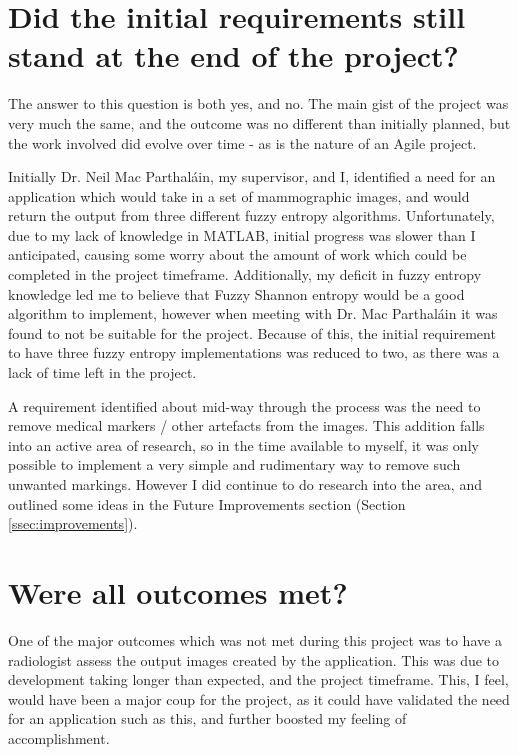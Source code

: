 \section{Did the initial requirements still stand at the end of the project?}

The answer to this question is both yes, and no. The main gist of the project was very much the same, and the outcome was no different than initially planned, but the work involved did evolve over time - as is the nature of an Agile project.

Initially Dr. Neil Mac Parthal\'ain, my supervisor, and I, identified a need for an application which would take in a set of \gls{mammographic images}, and would return the output from three different fuzzy entropy algorithms. Unfortunately, due to my lack of knowledge in MATLAB, initial progress was slower than I anticipated, causing some worry about the amount of work which could be completed in the project timeframe. Additionally, my deficit in fuzzy entropy knowledge led me to believe that Fuzzy Shannon entropy would be a good algorithm to implement, however when meeting with Dr. Mac Parthal\'ain it was found to not be suitable for the project. Because of this, the initial requirement to have three fuzzy entropy implementations was reduced to two, as there was a lack of time left in the project.

A requirement identified about mid-way through the process was the need to remove medical markers / other artefacts from the images. This addition falls into an active area of research, so in the time available to myself, it was only possible to implement a very simple and rudimentary way to remove such unwanted markings. However I did continue to do research into the area, and outlined some ideas in the Future Improvements section (Section \ref{ssec:improvements}).

\section{Were all outcomes met?}

One of the major outcomes which was not met during this project was to have a radiologist assess the output images created by the application. This was due to development taking longer than expected, and the project timeframe. This, I feel, would have been a major coup for the project, as it could have validated the need for an application such as this, and further boosted my feeling of accomplishment.

